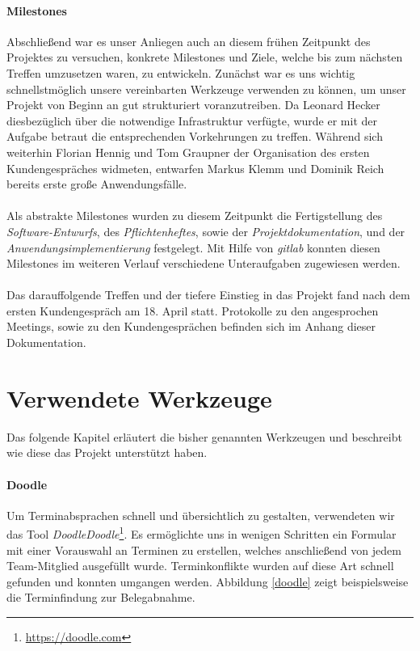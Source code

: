 \paragraph{Milestones}Abschließend war es unser Anliegen auch an diesem frühen Zeitpunkt des Projektes zu versuchen, konkrete Milestones und Ziele, welche bis zum nächsten Treffen umzusetzen waren, zu entwickeln. Zunächst war es uns wichtig schnellstmöglich unsere vereinbarten Werkzeuge verwenden zu können, um unser Projekt von Beginn an gut strukturiert voranzutreiben. Da Leonard Hecker diesbezüglich über die notwendige Infrastruktur verfügte, wurde er mit der Aufgabe betraut die entsprechenden Vorkehrungen zu treffen. Während sich weiterhin Florian Hennig und Tom Graupner der Organisation des ersten Kundengespräches widmeten, entwarfen Markus Klemm und Dominik Reich bereits erste große Anwendungsfälle.

\paragraph{}Als abstrakte Milestones wurden zu diesem Zeitpunkt die Fertigstellung des \textit{Software-Entwurfs}, des \textit{Pflichtenheftes}, sowie der \textit{Projektdokumentation}, und der \textit{Anwendungsimplementierung} festgelegt. Mit Hilfe von \textit{gitlab} konnten diesen Milestones im weiteren Verlauf verschiedene Unteraufgaben zugewiesen werden.

\paragraph{}Das darauffolgende Treffen und der tiefere Einstieg in das Projekt fand nach dem ersten Kundengespräch am 18. April statt. Protokolle zu den angesprochen Meetings, sowie zu den Kundengesprächen befinden sich im Anhang dieser Dokumentation.

\section{Verwendete Werkzeuge}\label{TeamOrg:Werkzeuge}
Das folgende Kapitel erläutert die bisher genannten Werkzeugen und beschreibt wie diese das Projekt unterstützt haben.

\paragraph{Doodle}Um Terminabsprachen schnell und übersichtlich zu gestalten, verwendeten wir das Tool \textit{Doodle}\textit{Doodle}\footnote{\url{https://doodle.com}}. Es ermöglichte uns in wenigen Schritten ein Formular mit einer Vorauswahl an Terminen zu erstellen, welches anschließend von jedem Team-Mitglied ausgefüllt wurde. Terminkonflikte wurden auf diese Art schnell gefunden und konnten umgangen werden. Abbildung \ref{doodle} zeigt beispielsweise die Terminfindung zur Belegabnahme.

